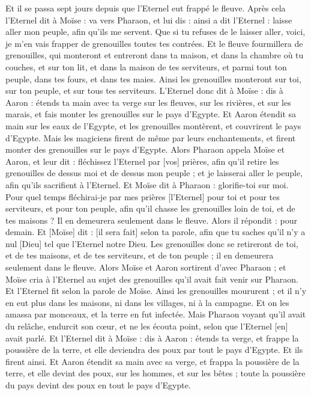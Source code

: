 \begin{multicols}{2}
Et il se passa sept jours depuis que l'Eternel eut frappé le fleuve.
\VerseOne{}Après cela l'Eternel dit à Moïse : va vers Pharaon, et lui dis : ainsi a dit l'Eternel : laisse aller mon peuple, afin qu'ils me servent.
Que si tu refuses de le laisser aller, voici, je m'en vais frapper de grenouilles toutes tes contrées.
Et le fleuve fourmillera de grenouilles, qui monteront et entreront dans ta maison, et dans la chambre où tu couches, et sur ton lit, et dans la maison de tes serviteurs, et parmi tout ton peuple, dans tes fours, et dans tes maies.
Ainsi les grenouilles monteront sur toi, sur ton peuple, et sur tous tes serviteurs.
L'Eternel donc dit à Moïse : dis à Aaron : étends ta main avec ta verge sur les fleuves, sur les rivières, et sur les marais, et fais monter les grenouilles sur le pays d'Egypte.
Et Aaron étendit sa main sur les eaux de l'Egypte, et les grenouilles montèrent, et couvrirent le pays d'Egypte.
Mais les magiciens firent de même par leurs enchantements, et firent monter des grenouilles sur le pays d'Egypte.
Alors Pharaon appela Moïse et Aaron, et leur dit : fléchissez l'Eternel par [vos] prières, afin qu'il retire les grenouilles de dessus moi et de dessus mon peuple ; et je laisserai aller le peuple, afin qu'ils sacrifient à l'Eternel.
Et Moïse dit à Pharaon : glorifie-toi sur moi. Pour quel temps fléchirai-je par mes prières [l'Eternel] pour toi et pour tes serviteurs, et pour ton peuple, afin qu'il chasse les grenouilles loin de toi, et de tes maisons ? Il en demeurera seulement dans le fleuve.
Alors il répondit : pour demain. Et [Moïse] dit : [il sera fait] selon ta parole, afin que tu saches qu'il n'y a nul [Dieu] tel que l'Eternel notre Dieu.
Les grenouilles donc se retireront de toi, et de tes maisons, et de tes serviteurs, et de ton peuple ; il en demeurera seulement dans le fleuve.
Alors Moïse et Aaron sortirent d'avec Pharaon ; et Moïse cria à l'Eternel au sujet des grenouilles qu'il avait fait venir sur Pharaon.
Et l'Eternel fit selon la parole de Moïse. Ainsi les grenouilles moururent ; et il n'y en eut plus dans les maisons, ni dans les villages, ni à la campagne.
Et on les amassa par monceaux, et la terre en fut infectée.
Mais Pharaon voyant qu'il avait du relâche, endurcit son cœur, et ne les écouta point, selon que l'Eternel [en] avait parlé.
Et l'Eternel dit à Moïse : dis à Aaron : étends ta verge, et frappe la poussière de la terre, et elle deviendra des poux par tout le pays d'Egypte.
Et ils firent ainsi. Et Aaron étendit sa main avec sa verge, et frappa la poussière de la terre, et elle devint des poux, sur les hommes, et sur les bêtes ; toute la poussière du pays devint des poux en tout le pays d'Egypte.

\end{multicols}
